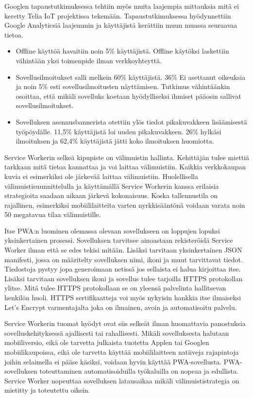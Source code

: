 \documentclass{tktltiki}
\begin{document}
Googlen tapaustutkimuksessa tehtiin myös muita laajempia mittauksia mitä ei keretty Telia IoT projektissa tekemään. Tapaustutkimuksessa hyödynnettiin Google Analyticsiä laajemmin ja käyttäjistä kerättiin muun muassa seuraavaa tietoa. 

\begin{itemize}
  \item Offline käyttöä havaitiin noin 5\% käyttäjistä. Offline käytöksi laskettiin vähintään yksi toimenpide ilman verkkoyhteyttä.
  \item Sovellusilmoitukset salli melkein 60\% käyttäjistä. 36\% Ei asettanut oikeuksia ja noin 5\% esti sovellusilmoitusten näyttämisen. Tutkimus vähintäänkin osoittaa, että mikäli sovelluks koetaan hyödylliseksi ihmiset pääosin sallivat sovellusilmoitukset. 
  \item Sovelluksen asennusbannerista otettiin ylös tiedot pikakuvakkeen lisäämisestä työpöydälle. 11,5\% käyttäjistä loi uuden pikakuvakkeen. 26\% hylkäsi ilmoituksen ja 62,4\% käyttäjistä jätti koko ilmoituksen huomiotta.
\end{itemize}
 
Service Workerin selkeä kipupiste on välimuistin hallinta. Kehittäjän tulee miettiä tarkkaan mitä tietoa kannattaa ja voi laittaa välimuistiin. Kaikkia verkkokaupan kuvia ei esimerkiksi ole järkevää laittaa välimuistiin. Huolellisella välimuistisuunnittelulla ja käyttämällä Service Workerin kanssa erilaisia strategioita saadaan aikaan järkevä kokonaisuus. Koska tallennustila on rajallinen, esimerkiksi mobiililaitteita varten nyrkkisääntönä voidaan varata noin 50 megatavua tilaa välimuistille. \cite{Love}

Itse PWA:n luominen olemassa olevaan sovellukseen on loppujen lopuksi yksinkertainen prosessi. Sovelluksen tarvitsee ainoastaan rekisteröidä Service Worker ilman että se edes tekisi mitään. Lisäksi tarvitaan yksinkertainen JSON manifesti, jossa on määritelty sovelluksen nimi, ikoni ja muut tarvittavat tiedot. Tiedostoja pystyy jopa generoimaan netissä jos sellaista ei halua kirjoittaa itse. Lisäksi tarvitaan sovelluksen ikoni ja sovellus tulee tarjoilla HTTPS protokollan ylitse. Mitä tulee HTTPS protokollaan se on yleensä palvelinta hallitsevan henkilön huoli. HTTPS sertifikaatteja voi myös nykyisin hankkia itse ilmaiseksi Let's Encrypt varmentajalta joka on ilmainen, avoin ja automatisoitu palvelu.

Service Workerin tuomat hyödyt ovat siis selkeät ilman huomattavia panostuksia sovelluskehityksessä ajallisesti tai rahallisesti. Mikäli sovelluksesta halutaan  mobiiliversio, eikä ole tarvetta julkaista tuotetta Applen tai Googlen mobiilikaupoissa, eikä ole tarvetta käyttää mobiililaitteen natiiveja rajapintoja joihin selaimella ei pääse käsiksi, voidaan hyvin käyttää PWA-sovellusta. PWA-sovelluksen toteuttaminen automatisoiduilla työkaluilla on nopeaa ja edullista. Service Worker nopeuttaa sovelluksen latausaikaa mikäli välimuististrategia on mietitty ja toteutettu oikein. 
\end{document}
